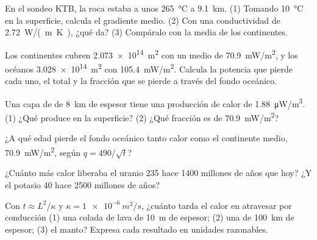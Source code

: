 \begin{exercise}[$\star\star$]\label{exo:g12:internal-heat:6}
En el sondeo KTB, la roca estaba a unos \qty{265}{\celsius} a
\qty{9.1}{km}. (1) Tomando \qty{10}{\celsius} en la superficie, calcula el
gradiente medio. (2) Con una conductividad de \qty{2.72}{W/(m.K)}, ¿qué  da? (3) Compáralo con la media de los continentes.
\end{exercise}

\begin{exercise}[$\star\star$]\label{exo:g12:internal-heat:7}
Los continentes cubren \qty{2.073e14}{m^2} con un  medio de
\qty{70.9}{mW/m^2}, y los océanos \qty{3.028e14}{m^2} con
\qty{105.4}{mW/m^2}. Calcula la potencia que pierde cada uno, el total y la
fracción que se pierde a través del fondo oceánico.
\end{exercise}

\begin{exercise}[$\star\star$]\label{exo:g12:internal-heat:8}
Una capa de  de \qty{8}{km} de espesor tiene una producción de
calor de \qty{1.88}{\micro W/m^3}. (1) ¿Qué  produce en la
superficie? (2) ¿Qué fracción es de \qty{70.9}{mW/m^2}?
\end{exercise}

\begin{exercise}[$\star\star$]\label{exo:g12:internal-heat:9}
¿A qué edad pierde el fondo oceánico tanto calor como el continente medio,
\qty{70.9}{mW/m^2}, según $q = 490/\sqrt{t}$?
\end{exercise}

\begin{exercise}[$\star\star$]\label{exo:g12:internal-heat:10}
¿Cuánto más calor liberaba el uranio 235 hace 1400 millones de años que hoy?
¿Y el potasio 40 hace 2500 millones de años?
\end{exercise}

\begin{exercise}[$\star\star$]\label{exo:g12:internal-heat:11}
Con $t \approx L^2/\kappa$ y $\kappa = \qty{1e-6}{m^2/s}$, ¿cuánto tarda el
calor en atravesar por conducción (1) una colada de lava de \qty{10}{m} de
espesor; (2) una  de \qty{100}{km} de espesor; (3) el manto? Expresa
cada resultado en unidades razonables.
\end{exercise}

